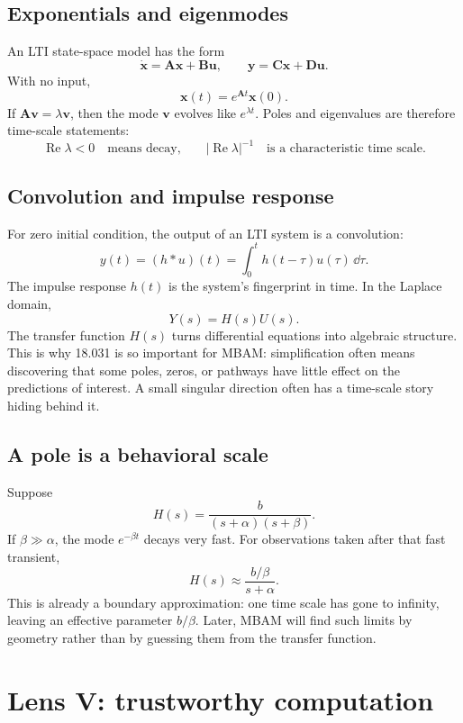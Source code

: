 \documentclass[a4paper]{article}
\newcommand{\mat}[1]{\mathbf{#1}}
\newcommand{\vect}[1]{\mathbf{#1}}
\begin{document}
\subsection{Exponentials and eigenmodes}

An LTI state-space model has the form
\[
  \dot{\vect{x}}=\mat{A}\vect{x}+\mat{B}\vect{u},
  \qquad
  \vect{y}=\mat{C}\vect{x}+\mat{D}\vect{u}.
\]
With no input,
\[
  \vect{x}(t)=e^{\mat{A}t}\vect{x}(0).
\]
If \(\mat{A}\vect{v}=\lambda\vect{v}\), then the mode \(\vect{v}\) evolves like \(e^{\lambda t}\).  Poles and eigenvalues are therefore time-scale statements:
\[
  \operatorname{Re}\lambda<0
  \quad\text{means decay,}\qquad
  |\operatorname{Re}\lambda|^{-1}
  \quad\text{is a characteristic time scale.}
\]

\subsection{Convolution and impulse response}

For zero initial condition, the output of an LTI system is a convolution:
\[
  y(t)
  =
  (h*u)(t)
  =
  \int_0^t h(t-\tau)u(\tau)\,\dd\tau.
\]
The impulse response \(h(t)\) is the system's fingerprint in time.  In the Laplace domain,
\[
  Y(s)=H(s)U(s).
\]
The transfer function \(H(s)\) turns differential equations into algebraic structure.  This is why 18.031 is so important for MBAM: simplification often means discovering that some poles, zeros, or pathways have little effect on the predictions of interest.  A small singular direction often has a time-scale story hiding behind it.

\subsection{A pole is a behavioral scale}

Suppose
\[
  H(s)=\frac{b}{(s+\alpha)(s+\beta)}.
\]
If \(\beta\gg\alpha\), the mode \(e^{-\beta t}\) decays very fast.  For observations taken after that fast transient,
\[
  H(s)
  \approx
  \frac{b/\beta}{s+\alpha}.
\]
This is already a boundary approximation: one time scale has gone to infinity, leaving an effective parameter \(b/\beta\).  Later, MBAM will find such limits by geometry rather than by guessing them from the transfer function.

\section{Lens V: trustworthy computation}
\end{document}
